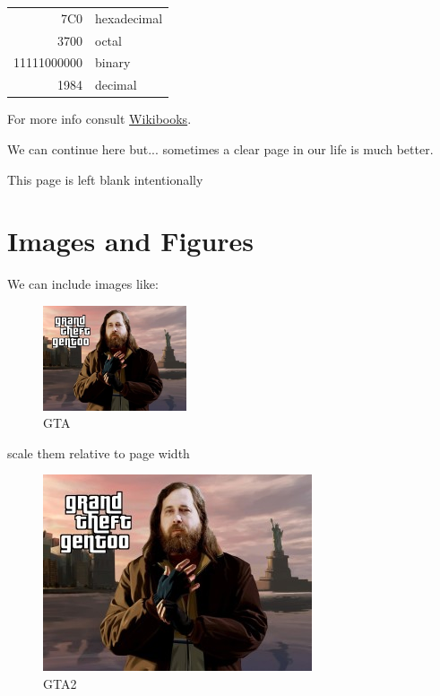 \documentclass[a4paper, 12pt, titlepage]{article}
\begin{document}

\begin{table}[H]
	\begin{flushright}
		\begin{tabular}{|r|l|}
			\hline
			7C0 & hexadecimal \\
			3700 & octal \\ \cline{2-2}
			11111000000 & binary \\
			\hline \hline
			1984 & decimal \\
			\hline
		\end{tabular}
	\end{flushright}
\end{table}

For more info consult \href{https://en.wikibooks.org/wiki/LaTeX/Tables}{Wikibooks}.

We can continue here but... \newpage
sometimes a clear page in our life is much better.

\vspace{150pt}

{\LARGE This page is left blank intentionally} \\


\newpage

\section{Images and Figures}

We can include images like:

\begin{figure}[H]
	\centering
	\caption{GTA}
	\label{fig:gta}
	\includegraphics[width=120pt]{gta.jpg}
\end{figure}

scale them relative to page width

\begin{figure}[H]
	\centering
	\caption{GTA2}
	\label{fig:gta2}
	\includegraphics[width=.65\textwidth]{gta.jpg} %
\end{figure}
\end{document}
